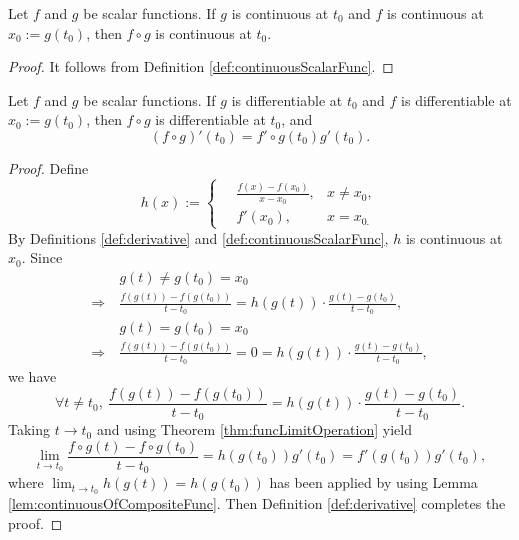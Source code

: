 \begin{lem}
  \label{lem:continuousOfCompositeFunc}
  Let $f$ and $g$ be scalar functions.
  If $g$ is continuous at $t_{0}$ and
  $f$ is continuous at $x_{0}:=g(t_{0})$, then
  $f\circ g$ is continuous at $t_{0}$.
\end{lem}
\begin{proof}
  It follows from Definition \ref{def:continuousScalarFunc}.
\end{proof}

\begin{thm}
  \label{thm:chainRuleOnScalarFunc}
  Let $f$ and $g$ be scalar functions.
  If $g$ is differentiable at $t_{0}$ and
  $f$ is differentiable at $x_{0}:=g(t_{0})$, then
  $f\circ g$ is differentiable at $t_{0}$, and
  \begin{equation}
    \label{eq:chainRuleOnScalarFunc}
    (f\circ g)'(t_{0})=f'\circ g(t_{0})g'(t_{0}).
  \end{equation}
\end{thm}
\begin{proof}
  Define
  \begin{displaymath}
    h(x):=
    \left\lbrace
      \begin{aligned}
        &\ \frac{f(x)-f(x_{0})}{x-x_{0}},  &x\neq x_{0},\\
        &\ f'(x_{0}),  &x=x_{0.}
      \end{aligned}
    \right.
  \end{displaymath}
  By Definitions \ref{def:derivative} and \ref{def:continuousScalarFunc},
  $h$ is continuous at $x_{0}$. Since
  \begin{align*}
    &\ g(t)\neq g(t_{0})=x_{0}  \\
    \Rightarrow &\
    \frac{f(g(t))-f(g(t_{0}))}{t-t_{0}}
                 = h(g(t))\cdot\frac{g(t)-g(t_{0})}{t-t_{0}},\\
    &\ g(t)=g(t_{0})=x_{0}  \\
    \Rightarrow &\
    \frac{f(g(t))-f(g(t_{0}))}{t-t_{0}}=0
                  =h(g(t))\cdot \frac{g(t)-g(t_{0})}{t-t_{0}},
  \end{align*}
  we have
  \begin{displaymath}
    \forall t\neq t_{0},\
    \frac{f(g(t))-f(g(t_{0}))}{t-t_{0}}
                  =h(g(t))\cdot\frac{g(t)-g(t_{0})}{t-t_{0}}.
  \end{displaymath}
  Taking $t\rightarrow t_{0}$ and
  using Theorem \ref{thm:funcLimitOperation} yield
  \begin{displaymath}
    \lim_{t\rightarrow t_{0}}\frac{f\circ g(t)-f\circ g(t_{0})}{t-t_{0}}
    =h(g(t_{0}))g'(t_{0})=f'(g(t_{0}))g'(t_{0}),
  \end{displaymath}
  where $\lim_{t\rightarrow t_{0}}h(g(t))=h(g(t_{0}))$ has been applied
  by using Lemma \ref{lem:continuousOfCompositeFunc}.
  Then Definition \ref{def:derivative} completes the proof.
\end{proof}

